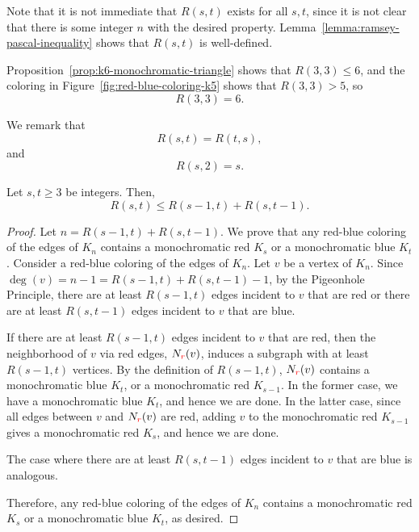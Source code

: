 Note that it is not immediate that \(R(s, t)\) exists for all \(s, t\),
since it is not clear that there is some integer \(n\) with the desired property.
Lemma~\ref{lemma:ramsey-pascal-inequality} shows that \(R(s, t)\) is well-defined.

\begin{example}
    Proposition~\ref{prop:k6-monochromatic-triangle} shows that \(R(3, 3) \leq 6\), and the coloring in Figure~\ref{fig:red-blue-coloring-k5} shows that \(R(3, 3) > 5\),
    so
    \begin{equation}
        R(3, 3) = 6.
    \end{equation}
\end{example}

We remark that 
\begin{equation}
    R(s, t) = R(t, s),
\end{equation}
and
\begin{equation}
    R(s, 2) = s.
\end{equation}

\begin{lemma} \label{lemma:ramsey-pascal-inequality}
    Let \(s, t \geq 3\) be integers.
    Then,
    \begin{equation}
        R(s, t) \leq R(s - 1, t) + R(s, t - 1).
    \end{equation}
\end{lemma}

\begin{proof}
    Let \(n = R(s - 1, t) + R(s, t - 1)\).
    We prove that any red-blue coloring of the edges of \(K_n\) contains a monochromatic red \(K_s\) or a monochromatic blue \(K_t\).
    Consider a red-blue coloring of the edges of \(K_n\).
    Let \(v\) be a vertex of \(K_n\).
    Since \(\deg(v) = n - 1 =  R(s - 1, t) + R(s, t - 1) - 1\),
    by the Pigeonhole Principle,
    there are at least \(R(s - 1, t)\) edges incident to \(v\) that are red
    or there are at least \(R(s, t - 1)\) edges incident to \(v\) that are blue.

    If there are at least \(R(s - 1, t)\) edges incident to \(v\) that are red,
    then the neighborhood of \(v\) via red edges, \(N_{\textcolor{red}{r}}(v)\),
    induces a subgraph with at least \(R(s - 1, t)\) vertices.
    By the definition of \(R(s - 1, t)\),
    \(N_{\textcolor{red}{r}}(v)\) contains a monochromatic blue \(K_t\),
    or a monochromatic red \(K_{s - 1}\).
    In the former case, we have a monochromatic blue \(K_t\), and hence we are done.
    In the latter case, since all edges between \(v\) and \(N_{\textcolor{red}{r}}(v)\) are red,
    adding \(v\) to the monochromatic red \(K_{s - 1}\) gives a monochromatic red \(K_s\), and hence we are done.

    The case where there are at least \(R(s, t - 1)\) edges incident to \(v\) that are blue is analogous.

    Therefore, any red-blue coloring of the edges of \(K_n\) contains a monochromatic red \(K_s\) or a monochromatic blue \(K_t\), as desired.
\end{proof}

